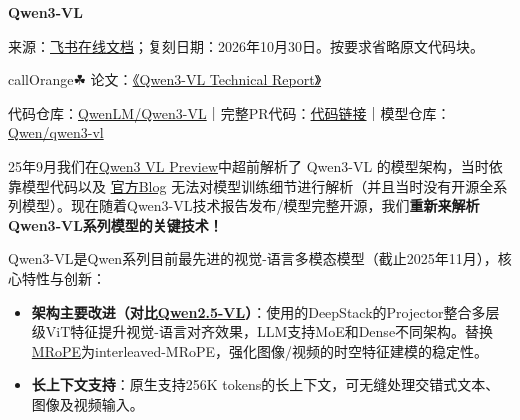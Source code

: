\documentclass[zihao=false,fontset=windows]{ctexart}
\begin{document}
{\bfseries Qwen3-VL\par}
\begin{feishuquote}来源：\href{https://scnajei2ds6y.feishu.cn/wiki/IBFPwd8kpiW94gkOgCIcTnDZnnh}{飞书在线文档}；复刻日期：2026年10月30日。按要求省略原文代码块。\end{feishuquote}
\begin{feishubox}{callOrange}{☘}
论文：\href{https://arxiv.org/pdf/2511.21631}{《Qwen3-VL Technical Report》}\par

代码仓库：\href{https://github.com/QwenLM/Qwen3-VL}{QwenLM/Qwen3-VL}｜完整PR代码：\href{https://github.com/huggingface/transformers/blob/088e9c30712151060aacecd3454150f4edd83cd1/src/transformers/models/qwen3_vl/modeling_qwen3_vl.py}{代码链接}｜模型仓库：\href{https://huggingface.co/collections/Qwen/qwen3-vl}{Qwen/qwen3-vl}\par

\end{feishubox}

25年9月我们在\href{https://scnajei2ds6y.feishu.cn/wiki/P8WqwpoUdicF9bkvaTqcdcS5nDb?from=from_copylink}{Qwen3 VL Preview}中超前解析了 Qwen3-VL 的模型架构，当时依靠模型代码以及 \href{https://qwenlm.github.io/blog/qwen3/}{官方Blog} 无法对模型训练细节进行解析（并且当时没有开源全系列模型）。现在随着Qwen3-VL技术报告发布/模型完整开源，我们\textcolor{feishuRed}{\textbf{重新来解析Qwen3-VL系列模型的关键技术！}}\par

Qwen3-VL是Qwen系列目前最先进的视觉-语言多模态模型（截止2025年11月），核心特性与创新：\par

\begin{itemize}[label=\textcolor{feishuBlue}{1.}]
\item \textbf{架构主要改进（对比}\textbf{\href{https://scnajei2ds6y.feishu.cn/wiki/S7Q2wviQhiYtQFk4jKvccQwDnWe}{Qwen2.5-VL}}\textbf{）}：使用的DeepStack的Projector整合多层级ViT特征提升视觉-语言对齐效果，LLM支持MoE和Dense不同架构。替换\href{https://scnajei2ds6y.feishu.cn/wiki/JboKw8o8UiaUQbk1CBDckrtFn3f}{MRoPE}为interleaved-MRoPE，强化图像/视频的时空特征建模的稳定性。

\end{itemize}

\begin{itemize}[label=\textcolor{feishuBlue}{2.}]
\item \textbf{长上下文支持}：原生支持256K tokens的长上下文，可无缝处理交错式文本、图像及视频输入。

\end{itemize}
\end{document}
